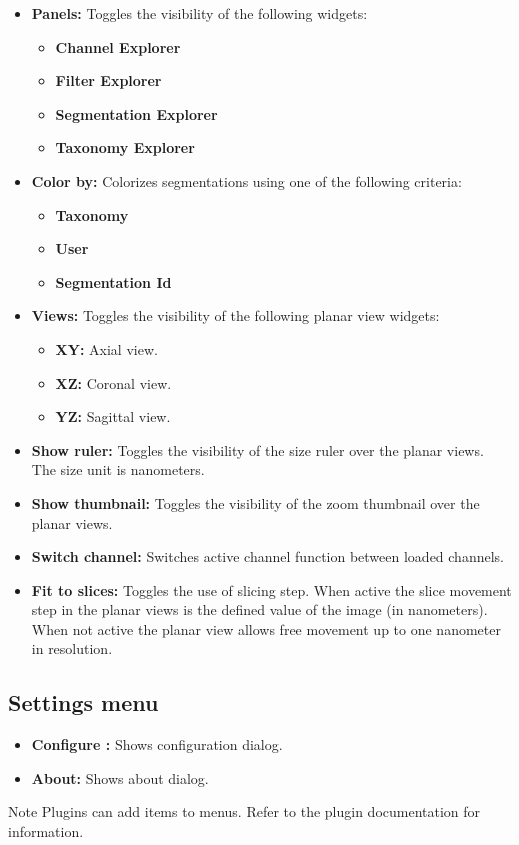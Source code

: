 \begin{itemize}
\item \textbf{Panels:} Toggles the visibility of the following widgets:
	\begin{itemize}
	\item \textbf{Channel Explorer}
	\item \textbf{Filter Explorer}
	\item \textbf{Segmentation Explorer}
	\item \textbf{Taxonomy Explorer}
	\end{itemize}
\item \textbf{Color by:} Colorizes segmentations using one of the following criteria:
	\begin{itemize}
	\item \textbf{Taxonomy}
	\item \textbf{User}
	\item \textbf{Segmentation Id}
	\end{itemize}
\item \textbf{Views:} Toggles the visibility of the following planar view widgets:
	\begin{itemize}
	\item \textbf{XY:} Axial view.
	\item \textbf{XZ:} Coronal view.
	\item \textbf{YZ:} Sagittal view.
	\end{itemize}
\item \textbf{Show ruler:} Toggles the visibility of the size ruler over the planar views. The size unit is nanometers.
\item \textbf{Show thumbnail:} Toggles the visibility of the zoom thumbnail over the planar views.
\item \textbf{Switch channel:} Switches active channel function between loaded channels.
\item \textbf{Fit to slices:} Toggles the use of slicing step. When active the slice movement step in the planar views is the defined value of the image (in nanometers).
When not active the planar view allows free movement up to one nanometer in resolution.
\end{itemize}

\subsection{Settings menu}

\begin{itemize}
\item \textbf{Configure \espina:} Shows \espina{} configuration dialog.
\item \textbf{About:} Shows \espina{} about dialog.
\end{itemize}

\begin{bclogo}[couleur = yellow!33, logo=\bcattention]
{Note} Plugins can add items to menus. Refer to the plugin documentation for information.
\end{bclogo}
